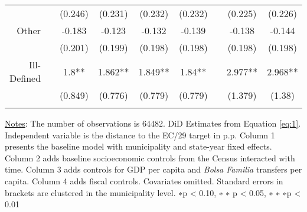 \begin{table}[h!]
\begin{footnotesize}
\begin{center}
{\begin{threeparttable}[b]
\begin{tabular}{rrccccccc}
          &       & (0.246) & (0.231) & (0.232) & (0.232) &       & (0.225) & (0.226) \\
    \multicolumn{1}{p{15.145em}}{Other} &       & -0.183 & -0.123 & -0.132 & -0.139 &       & -0.138 & -0.144 \\
          &       & (0.201) & (0.199) & (0.198) & (0.198) &       & (0.198) & (0.198) \\
    \multicolumn{1}{p{15.145em}}{Ill-Defined} &       & 1.8** & 1.862** & 1.849** & 1.84** &       & 2.977** & 2.968** \\
          &       & (0.849) & (0.776) & (0.779) & (0.779) &       & (1.379) & (1.38) \\
          &       &       &       &       &       &       &       &  \\
    \bottomrule
    \bottomrule
    \end{tabular}%
    
    
    \begin{tablenotes}
  \scriptsize{\underline{Notes}: The number of observations is 64482. DiD Estimates from Equation \ref{eq:1}. Independent variable is the distance to the EC/29 target in p.p. Column 1 presents the baseline model with municipality and state-year fixed effects. Column 2 adds baseline socioeconomic controls from the Census interacted with time. Column 3 adds controls for GDP per capita and \emph{Bolsa Familia} transfers per capita. Column 4 adds fiscal controls. Covariates omitted. Standard errors in brackets are clustered in the municipality level. ∗p < 0.10, ∗ ∗ p < 0.05, ∗ ∗ ∗p < 0.01}
  \end{tablenotes}
    
    
  \label{table:app_imr}%

\end{threeparttable}
}
\end{center}
\end{footnotesize}
\end{table}